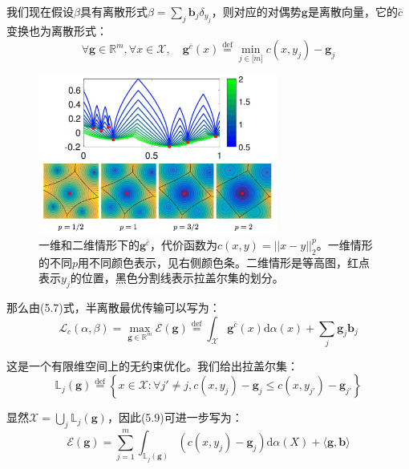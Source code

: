 \documentclass[cn,10pt,math=newtx,citestyle=gb7714-2015,bibstyle=gb7714-2015]{elegantbook}
\begin{document}
我们现在假设$\beta$具有离散形式$\beta=\sum_j \mathbf{b}_j \delta_{y_j}$，则对应的对偶势$\mathbf{g}$是离散向量，它的$\bar c$变换也为离散形式：
\begin{equation}
    \forall \mathbf{g}\in \mathbb{R}^m, \forall x\in \mathcal{X}, \quad \mathbf{g}^{\bar c}(x) \overset{\text{def}}{=} \min_{j\in \mathbb{[}m\mathbb{]}} c(x,y_j) - \mathbf{g}_j
\end{equation}

\begin{figure}[H]
    \centering
    \includegraphics[width=0.7\textwidth]{figure/fig5.1.png}
    \caption{一维和二维情形下的$\mathbf{g}^{\bar c}$，代价函数为$c(x,y)=||x-y||_2^p$。一维情形的不同$p$用不同颜色表示，见右侧颜色条。二维情形是等高图，红点表示$y_j$的位置，黑色分割线表示拉盖尔集的划分。}
    \label{图5.1}
\end{figure}

那么由(5.7)式，半离散最优传输可以写为：
\begin{equation}
    \mathcal{L}_c(\alpha, \beta) = \max_{\mathbf{g}\in\mathbb{R}^m} \mathcal{E}(\mathbf{g}) \overset{\text{def}}{=} \int_\mathcal{X} \mathbf{g}^{\bar c}(x)\text{d}\alpha(x) + \sum_j \mathbf{g}_j\mathbf{b}_j
\end{equation}

这是一个有限维空间上的无约束优化。我们给出拉盖尔集：
\begin{equation}
    \mathbb{L}_j(\mathbf{g}) \overset{\text{def}}{=} \left\{ x\in \mathcal{X} : \forall j'\neq j, c(x,y_j)-\mathbf{g}_j \leq c(x,y_{j'})-\mathbf{g}_{j'} \right\}
\end{equation}

显然$\mathcal{X}=\bigcup_j \mathbb{L}_j(\mathbf{g})$，因此(5.9)可进一步写为：
\begin{equation}
    \mathcal{E}(\mathbf{g}) = \sum_{j=1}^m \int_{\mathbb{L}_j(\mathbf{g})} \left(c(x,y_j)-\mathbf{g}_j\right) \text{d}\alpha(X) + \langle \mathbf{g,b} \rangle
\end{equation}
\end{document}
